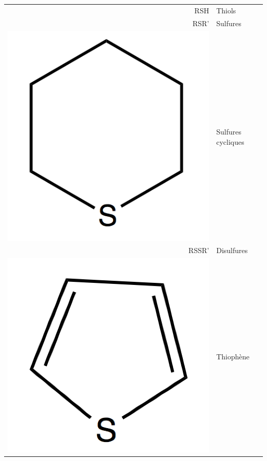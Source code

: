 \begin{table}[h!]
	\begin{center}
		\begin{tabular}{rl}
			\hline
			RSH & Thiols \\
			RSR' & Sulfures \\
			\includegraphics[scale=0.08]{image/sulfure-cycle} & Sulfures cycliques \\
			RSSR' & Disulfures \\
			 \includegraphics[scale=0.08]{image/thiophene} & Thiophène \\

\end{tabular}
\end{center}
\end{table}

